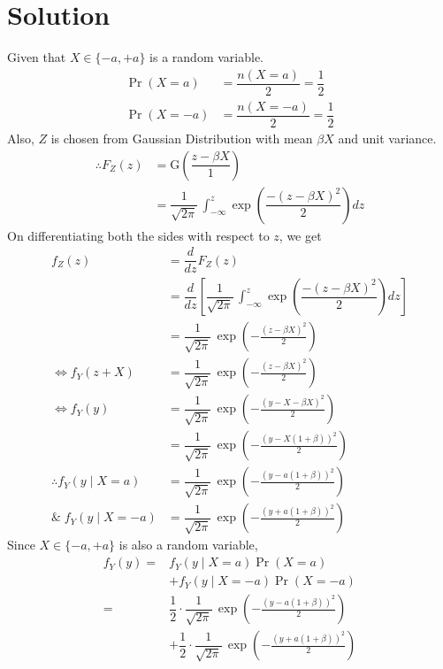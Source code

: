 \documentclass[journal,10pt,twocolumn]{IEEEtran}
\begin{document}
\section{Solution}
Given that $X \in \{ -a, +a\}$ is a random variable.
\begin{align}
\Pr(X=a) &= \dfrac{n(X=a)}{2} = \dfrac{1}{2}\\
\Pr(X=-a) &= \dfrac{n(X=-a)}{2} = \dfrac{1}{2}
\end{align}
Also, $Z$ is chosen from Gaussian Distribution with mean $\beta X$ and unit variance.
\begin{align}
\therefore F_Z(z) &= \text{G} \left( \dfrac{z - \beta X}{1} \right)\\
&= \dfrac{1}{\sqrt{2\pi}}\, \int_{-\infty} ^z \exp \left( \dfrac{-(z-\beta X)^2}{2} \right) dz
\end{align}
On differentiating both the sides with respect to $z$, we get
\begin{align}
f_Z(z) &= \dfrac{d}{dz}F_Z(z) \\
&= \dfrac{d}{dz} \left[ \dfrac{1}{\sqrt{2\pi}}\, \int_{-\infty} ^z \exp \left( \dfrac{-(z-\beta X)^2}{2} \right) dz \right] \\
 &= \dfrac{1}{\sqrt{2\pi}}\,\exp \left(-\frac{(z - \beta X)^2}{2} \right)  \\
\Leftrightarrow f_Y(z + X) &= \dfrac{1}{\sqrt{2\pi}}\,\exp \left(-\frac{(z - \beta X)^2}{2} \right)  \\
\Leftrightarrow f_Y(y) &= \dfrac{1}{\sqrt{2\pi}}\,\exp \left(-\frac{(y - X - \beta X)^2}{2} \right)  \\
&= \dfrac{1}{\sqrt{2\pi}}\,\exp \left(-\frac{(y - X(1 + \beta))^2}{2} \right) \\
\therefore f_Y(y \;|\; X = a) &= \dfrac{1}{\sqrt{2\pi}}\,\exp \left(-\frac{(y - a(1 + \beta))^2}{2} \right) \label{eqn 2.0.9} \\
\& \; f_Y(y \;|\; X = -a) &= \dfrac{1}{\sqrt{2\pi}}\,\exp \left(-\frac{(y + a(1 + \beta))^2}{2} \right) \label{eqn 2.0.10}
\end{align}
Since $X \in \{ -a, +a\}$ is also a random variable,
\begin{align}
f_Y(y) = &f_Y(y\;|\;X = a)\Pr(X=a) \nonumber \\
               &+ f_Y(y\;|\;X = -a)\Pr(X=-a)\\
 = &\dfrac{1}{2} \cdot \dfrac{1}{\sqrt{2\pi}}\,\exp \left(-\frac{(y - a(1 + \beta))^2}{2} \right) \nonumber \\
      &+ \dfrac{1}{2} \cdot \dfrac{1}{\sqrt{2\pi}}\,\exp \left(-\frac{(y + a(1 + \beta))^2}{2} \right)
\end{align}
\end{document}
